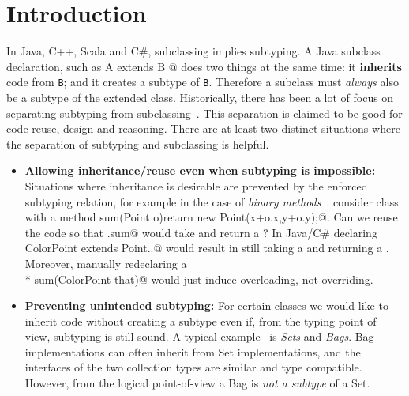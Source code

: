 \saveSpace
\section{Introduction}\label{sec:intro}
\saveSpace
In Java, C++, Scala and C\#, subclassing 
implies subtyping. A Java subclass declaration, such as 
\Q@class A extends B {}@
\noindent does two things at the same time:
it {\bf inherits} code from \lstinline{B}; and it creates
a subtype of \lstinline{B}. Therefore a subclass must \emph{always} also be a subtype of the extended class.
Historically, there has been a lot of focus on
separating subtyping from subclassing~\cite{cook}.  This separation is claimed to be
good for code-reuse, design and reasoning. There are at
least two distinct situations where the separation of subtyping and 
subclassing is helpful.

\begin{itemize}

\item {\bf Allowing inheritance/reuse even when subtyping is impossible:} 
Situations where inheritance is desirable are prevented
by the enforced subtyping relation, for example in the case of \emph{binary methods}~\cite{cook,bruce96binary}.
 consider class \Q@Point@ with a method 
\Q@Point sum(Point o){return new Point(x+o.x,y+o.y);}@.
Can we reuse the \Q@Point@ code so that \Q@ColorPoint.sum@
would take and return a \Q@ColorPoint@?
In Java/C\# declaring \Q@class ColorPoint extends Point{..}@ would result
in \Q@sum@ still taking a \Q@Point@ and returning a \Q@Point@.
Moreover, manually redeclaring a\\* \Q@ColorPoint sum(ColorPoint that)@
would just induce overloading, not overriding.
%

\item {\bf Preventing unintended subtyping:} For certain classes we
  would like to inherit code without creating a subtype even if, from
  the typing point of view, subtyping is still sound. A typical
  example~\cite{LaLonde:1991:SSS:110673.110679} is \emph{Sets} and
  \emph{Bags}. Bag implementations can often inherit 
  from Set implementations, and the interfaces of the two collection types are
  similar and type compatible. 
  However, from the logical point-of-view a Bag is \emph{not a
    subtype} of a Set. 

\end{itemize}

